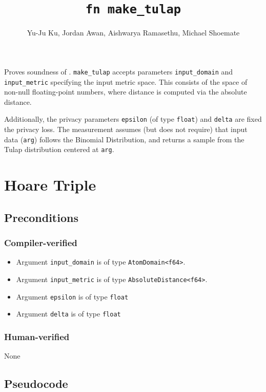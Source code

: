 \documentclass{article}
\title{\texttt{fn make\_tulap}}
\author{Yu-Ju Ku, Jordan Awan, Aishwarya Ramasethu, Michael Shoemate}
\begin{document}
\maketitle

\contrib

Proves soundness of .
\texttt{make\_tulap} accepts parameters \texttt{input\_domain} and \texttt{input\_metric} specifying the input metric space.
This consists of the space of non-null floating-point numbers, where distance is computed via the absolute distance.

Additionally, the privacy parameters \texttt{epsilon} (of type \texttt{float}) and \texttt{delta} are fixed the privacy loss.
The measurement assumes (but does not require) that input data (\texttt{arg}) follows the Binomial Distribution,
and returns a sample from the Tulap distribution centered at \texttt{arg}.

\section{Hoare Triple}

\subsection*{Preconditions}
\subsubsection*{Compiler-verified}
\begin{itemize}
    \item Argument \texttt{input\_domain} is of type \texttt{AtomDomain<f64>}.
    \item Argument \texttt{input\_metric} is of type \texttt{AbsoluteDistance<f64>}.
    \item Argument \texttt{epsilon} is of type \texttt{float}
    \item Argument \texttt{delta} is of type \texttt{float}
\end{itemize}

\subsubsection*{Human-verified}
None

\subsection*{Pseudocode}
\end{document}
